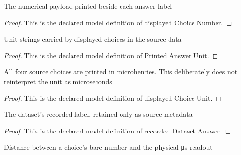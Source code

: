 \begin{definition}
  \label{def:physics:phyx-mini-0941:phyxminiproblems-problemphyxmini0941-displayedchoicenumber}
  The numerical payload printed beside each answer label
\end{definition}
\begin{proof}
  This is the declared model definition of displayed Choice Number.
\end{proof}
\begin{definition}
  \label{def:physics:phyx-mini-0941:phyxminiproblems-problemphyxmini0941-printedanswerunit}
  Unit strings carried by displayed choices in the source data
\end{definition}
\begin{proof}
  This is the declared model definition of Printed Answer Unit.
\end{proof}
\begin{definition}
  \label{def:physics:phyx-mini-0941:phyxminiproblems-problemphyxmini0941-displayedchoiceunit}
  All four source choices are printed in microhenries. This deliberately does not reinterpret the unit as microseconds
\end{definition}
\begin{proof}
  This is the declared model definition of displayed Choice Unit.
\end{proof}
\begin{definition}
  \label{def:physics:phyx-mini-0941:phyxminiproblems-problemphyxmini0941-recordeddatasetanswer}
  The dataset's recorded label, retained only as source metadata
\end{definition}
\begin{proof}
  This is the declared model definition of recorded Dataset Answer.
\end{proof}
\begin{definition}
  \label{def:physics:phyx-mini-0941:phyxminiproblems-problemphyxmini0941-numericalpayloaddistance}
  Distance between a choice's bare number and the physical μs readout
\end{definition}
